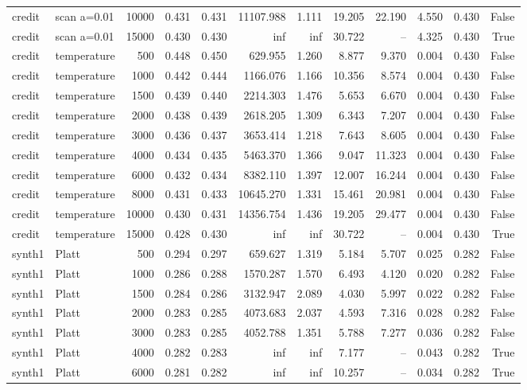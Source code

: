 \begin{tabular}{llrrrrrrrrrr}
credit & scan a=0.01 & 10000 & 0.431 & 0.431 & 11107.988 & 1.111 & 19.205 & 22.190 & 4.550 & 0.430 & False \\
credit & scan a=0.01 & 15000 & 0.430 & 0.430 & inf & inf & 30.722 & -- & 4.325 & 0.430 & True \\
credit & temperature & 500 & 0.448 & 0.450 & 629.955 & 1.260 & 8.877 & 9.370 & 0.004 & 0.430 & False \\
credit & temperature & 1000 & 0.442 & 0.444 & 1166.076 & 1.166 & 10.356 & 8.574 & 0.004 & 0.430 & False \\
credit & temperature & 1500 & 0.439 & 0.440 & 2214.303 & 1.476 & 5.653 & 6.670 & 0.004 & 0.430 & False \\
credit & temperature & 2000 & 0.438 & 0.439 & 2618.205 & 1.309 & 6.343 & 7.207 & 0.004 & 0.430 & False \\
credit & temperature & 3000 & 0.436 & 0.437 & 3653.414 & 1.218 & 7.643 & 8.605 & 0.004 & 0.430 & False \\
credit & temperature & 4000 & 0.434 & 0.435 & 5463.370 & 1.366 & 9.047 & 11.323 & 0.004 & 0.430 & False \\
credit & temperature & 6000 & 0.432 & 0.434 & 8382.110 & 1.397 & 12.007 & 16.244 & 0.004 & 0.430 & False \\
credit & temperature & 8000 & 0.431 & 0.433 & 10645.270 & 1.331 & 15.461 & 20.981 & 0.004 & 0.430 & False \\
credit & temperature & 10000 & 0.430 & 0.431 & 14356.754 & 1.436 & 19.205 & 29.477 & 0.004 & 0.430 & False \\
credit & temperature & 15000 & 0.428 & 0.430 & inf & inf & 30.722 & -- & 0.004 & 0.430 & True \\
synth1 & Platt & 500 & 0.294 & 0.297 & 659.627 & 1.319 & 5.184 & 5.707 & 0.025 & 0.282 & False \\
synth1 & Platt & 1000 & 0.286 & 0.288 & 1570.287 & 1.570 & 6.493 & 4.120 & 0.020 & 0.282 & False \\
synth1 & Platt & 1500 & 0.284 & 0.286 & 3132.947 & 2.089 & 4.030 & 5.997 & 0.022 & 0.282 & False \\
synth1 & Platt & 2000 & 0.283 & 0.285 & 4073.683 & 2.037 & 4.593 & 7.316 & 0.028 & 0.282 & False \\
synth1 & Platt & 3000 & 0.283 & 0.285 & 4052.788 & 1.351 & 5.788 & 7.277 & 0.036 & 0.282 & False \\
synth1 & Platt & 4000 & 0.282 & 0.283 & inf & inf & 7.177 & -- & 0.043 & 0.282 & True \\
synth1 & Platt & 6000 & 0.281 & 0.282 & inf & inf & 10.257 & -- & 0.034 & 0.282 & True \\

\end{tabular}
